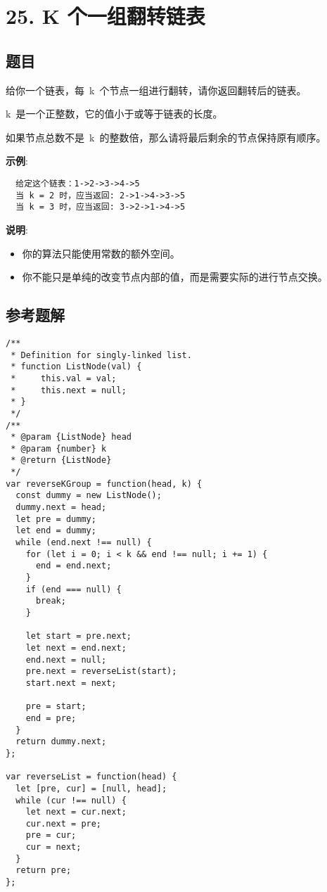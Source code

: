 \newpage
\section{25. K 个一组翻转链表}
\label{leetcode:25}

\subsection{题目}

给你一个链表，每 k 个节点一组进行翻转，请你返回翻转后的链表。

k 是一个正整数，它的值小于或等于链表的长度。

如果节点总数不是 k 的整数倍，那么请将最后剩余的节点保持原有顺序。

\textbf{示例}:

\begin{verbatim}
  给定这个链表：1->2->3->4->5
  当 k = 2 时，应当返回: 2->1->4->3->5
  当 k = 3 时，应当返回: 3->2->1->4->5
\end{verbatim}

\textbf{说明}:

\begin{itemize}
  \item 你的算法只能使用常数的额外空间。
  \item 你不能只是单纯的改变节点内部的值，而是需要实际的进行节点交换。
\end{itemize}

\subsection{参考题解}

\begin{verbatim}
/**
 * Definition for singly-linked list.
 * function ListNode(val) {
 *     this.val = val;
 *     this.next = null;
 * }
 */
/**
 * @param {ListNode} head
 * @param {number} k
 * @return {ListNode}
 */
var reverseKGroup = function(head, k) {
  const dummy = new ListNode();
  dummy.next = head;
  let pre = dummy;
  let end = dummy;
  while (end.next !== null) {
    for (let i = 0; i < k && end !== null; i += 1) {
      end = end.next;
    }
    if (end === null) {
      break;
    }

    let start = pre.next;
    let next = end.next;
    end.next = null;
    pre.next = reverseList(start);
    start.next = next;

    pre = start;
    end = pre;
  }
  return dummy.next;
};

var reverseList = function(head) {
  let [pre, cur] = [null, head];
  while (cur !== null) {
    let next = cur.next;
    cur.next = pre;
    pre = cur;
    cur = next;
  }
  return pre;
};
\end{verbatim}
